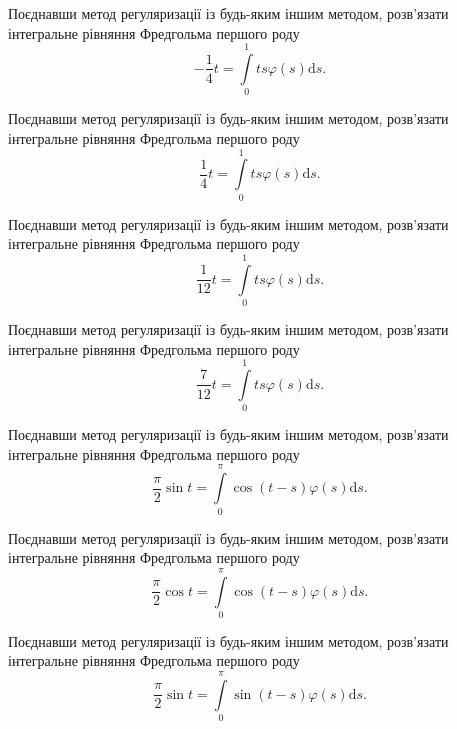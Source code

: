 \documentclass[12pt]{extarticle}
\begin{document}
\begin{Exercise}
Поєднавши метод регуляризації із будь-яким іншим методом, розв’язати інтегральне рівняння Фредгольма першого роду \[-\dfrac{1}{4}t = \int\limits_{0}^{1} ts \varphi(s) \mathrm{d}s.\]
\end{Exercise}

\begin{Exercise}
Поєднавши метод регуляризації із будь-яким іншим методом, розв’язати інтегральне рівняння Фредгольма першого роду \[\dfrac{1}{4}t = \int\limits_{0}^{1} ts \varphi(s) \mathrm{d}s.\]
\end{Exercise}

\begin{Exercise}
Поєднавши метод регуляризації із будь-яким іншим методом, розв’язати інтегральне рівняння Фредгольма першого роду \[\dfrac{1}{12}t = \int\limits_{0}^{1} ts \varphi(s) \mathrm{d}s.\]
\end{Exercise}

\begin{Exercise}
Поєднавши метод регуляризації із будь-яким іншим методом, розв’язати інтегральне рівняння Фредгольма першого роду \[\dfrac{7}{12}t = \int\limits_{0}^{1} ts \varphi(s) \mathrm{d}s.\]
\end{Exercise}

\begin{Exercise}
Поєднавши метод регуляризації із будь-яким іншим методом, розв’язати інтегральне рівняння Фредгольма першого роду \[\dfrac{\pi}{2}\sin t = \int\limits_{0}^{\pi} \cos (t-s) \varphi(s) \mathrm{d}s.\]
\end{Exercise}

\begin{Exercise}
Поєднавши метод регуляризації із будь-яким іншим методом, розв’язати інтегральне рівняння Фредгольма першого роду \[\dfrac{\pi}{2}\cos t = \int\limits_{0}^{\pi} \cos (t-s) \varphi(s) \mathrm{d}s.\]
\end{Exercise}

\begin{Exercise}
Поєднавши метод регуляризації із будь-яким іншим методом, розв’язати інтегральне рівняння Фредгольма першого роду \[\dfrac{\pi}{2}\sin t = \int\limits_{0}^{\pi} \sin (t - s) \varphi(s) \mathrm{d}s.\]
\end{Exercise}
\end{document}
